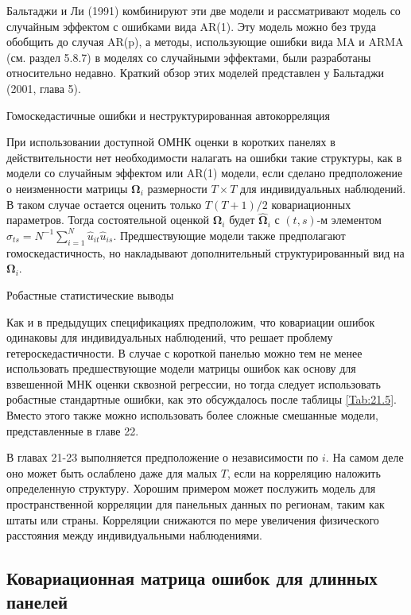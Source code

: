 Бальтаджи и Ли (1991) комбинируют эти две модели и рассматривают модель со случайным эффектом с ошибками вида AR(1). Эту модель можно без труда обобщить до случая AR(p), а методы, использующие ошибки вида MA и ARMA (см. раздел 5.8.7) в моделях со случайными эффектами, были разработаны относительно недавно. Краткий обзор этих моделей представлен у Бальтаджи (2001, глава 5).  

{\centering
Гомоскедастичные ошибки и неструктурированная автокорреляция \\}

При использовании доступной ОМНК оценки в коротких панелях в действительности нет необходимости налагать на ошибки такие структуры, как в модели со случайным эффектом или AR(1) модели, если сделано предположение о неизменности матрицы $\bm\Omega_i$ размерности $T \times T$ для индивидуальных наблюдений. В таком случае остается оценить только $T(T+1)/2$ ковариационных параметров. Тогда состоятельной оценкой $\bm\Omega_i$ будет $\hat{\bm\Omega}_i$ с $(t,s)$-м элементом $\hat{\sigma}_{ts}=N^{-1} \sum^N_{i=1} \hat{u}_{it} \hat{u}_{is}$. Предшествующие модели также предполагают гомоскедастичность, но накладывают дополнительный структурированный вид на $\bm\Omega_i$.

{\centering
Робастные статистические выводы\\}

Как и в предыдущих спецификациях предположим, что ковариации ошибок одинаковы для индивидуальных наблюдений, что решает проблему гетероскедастичности. В случае с короткой панелью можно тем не менее использовать предшествующие модели матрицы ошибок как основу для взвешенной МНК оценки сквозной регрессии, но тогда следует использовать робастные стандартные ошибки, как это обсуждалось после таблицы \ref{Tab:21.5}. Вместо этого также можно использовать  более сложные  смешанные модели, представленные в главе 22.

В главах 21-23 выполняется предположение о независимости по $i$. На самом деле оно может быть ослаблено даже для малых $T$, если на корреляцию наложить определенную структуру. Хорошим примером может послужить модель для пространственной корреляции для панельных данных по регионам, таким как штаты или страны. Корреляции снижаются по мере увеличения физического расстояния между индивидуальными наблюдениями. 

\subsection{Ковариационная матрица ошибок для длинных панелей}

